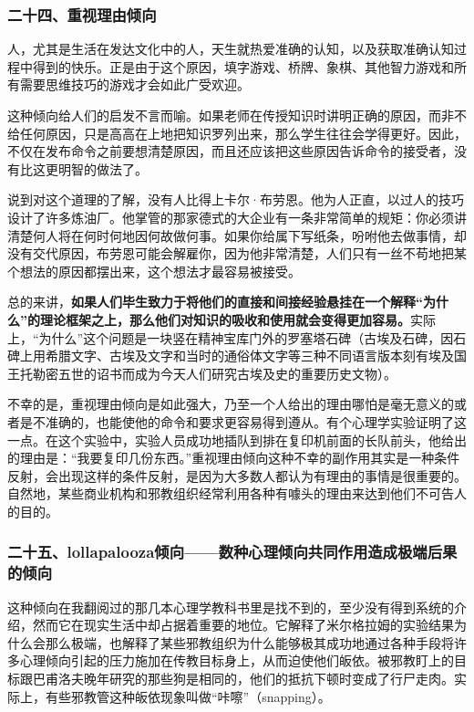\subsubsection*{二十四、重视理由倾向}

人，尤其是生活在发达文化中的人，天生就热爱准确的认知，以及获取准确认知过程中得到的快乐。正是由于这个原因，填字游戏、桥牌、象棋、其他智力游戏和所有需要思维技巧的游戏才会如此广受欢迎。
\par

这种倾向给人们的启发不言而喻。如果老师在传授知识时讲明正确的原因，而非不给任何原因，只是高高在上地把知识罗列出来，那么学生往往会学得更好。因此，不仅在发布命令之前要想清楚原因，而且还应该把这些原因告诉命令的接受者，没有比这更明智的做法了。
\par

说到对这个道理的了解，没有人比得上卡尔·布劳恩。他为人正直，以过人的技巧设计了许多炼油厂。他掌管的那家德式的大企业有一条非常简单的规矩：你必须讲清楚何人将在何时何地因何故做何事。如果你给属下写纸条，吩咐他去做事情，却没有交代原因，布劳恩可能会解雇你，因为他非常清楚，人们只有一丝不苟地把某个想法的原因都摆出来，这个想法才最容易被接受。
\par

总的来讲，\textbf{如果人们毕生致力于将他们的直接和间接经验悬挂在一个解释“为什么”的理论框架之上，那么他们对知识的吸收和使用就会变得更加容易。}实际上，“为什么”这个问题是一块竖在精神宝库门外的罗塞塔石碑（古埃及石碑，因石碑上用希腊文字、古埃及文字和当时的通俗体文字等三种不同语言版本刻有埃及国王托勒密五世的诏书而成为今天人们研究古埃及史的重要历史文物）。
\par

不幸的是，重视理由倾向是如此强大，乃至一个人给出的理由哪怕是毫无意义的或者是不准确的，也能使他的命令和要求更容易得到遵从。有个心理学实验证明了这一点。在这个实验中，实验人员成功地插队到排在复印机前面的长队前头，他给出的理由是：“我要复印几份东西。”重视理由倾向这种不幸的副作用其实是一种条件反射，会出现这样的条件反射，是因为大多数人都认为有理由的事情是很重要的。自然地，某些商业机构和邪教组织经常利用各种有噱头的理由来达到他们不可告人的目的。
\par

\subsubsection*{二十五、lollapalooza倾向——数种心理倾向共同作用造成极端后果的倾向}

这种倾向在我翻阅过的那几本心理学教科书里是找不到的，至少没有得到系统的介绍，然而它在现实生活中却占据着重要的地位。它解释了米尔格拉姆的实验结果为什么会那么极端，也解释了某些邪教组织为什么能够极其成功地通过各种手段将许多心理倾向引起的压力施加在传教目标身上，从而迫使他们皈依。被邪教盯上的目标跟巴甫洛夫晚年研究的那些狗是相同的，他们的抵抗下顿时变成了行尸走肉。实际上，有些邪教管这种皈依现象叫做“咔嚓”（snapping）。
\par

